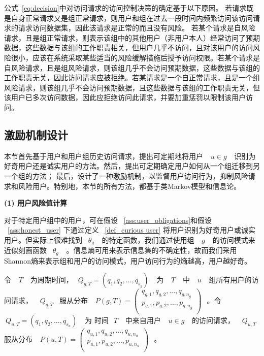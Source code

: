 公式~\ref{eq:decision}中对访问请求的访问控制决策的确定基于以下原因。 若请求既是自身正常请求又是组正常请求，则用户和组在过去一段时间内频繁访问该访问请求的请求访问数据集，因此该请求是正常的而且没有风险。 若某个请求是自风险请求，且是组正常请求，则表示该组中的其他用户（非用户本人）经常访问了预期数据，这些数据与该组的工作职责相关，但用户几乎不访问，且对该用户的访问风险很小，应该在系统采取某些适当的风险缓解措施后授予访问权限。若某个请求是自风险请求，且是组风险请求，则该组几乎不会访问预期数据，这些数据与该组的工作职责无关，因此访问请求应被拒绝。若某请求是一个自正常请求，且是一个组风险请求，则该组几乎不会访问预期数据，且这些数据与该组的工作职责无关，但该用户已多次访问数据，因此应拒绝访问此请求，并要加重惩罚以限制该用户访问。


\subsection{激励机制设计}
\label{subsec:User classification and incentive mechanism}

本节首先基于用户和用户组历史访问请求，提出可定期地将用户 ~$~u \in g~$~ 识别为好奇用户还是诚实用户的方法。然后，提出可定期确定用户如何从一个组迁移到另一个组的方法； 最后，设计了一种激励机制，以监督用户访问行为，抑制风险请求和风险用户。特别地，本节的所有方法，都基于类Markov模型和信息论。

\textbf{(1) 用户风险值计算}

对于特定用户组中的用户，可在假设 ~\ref{ass:user_obligations}和假设 ~\ref{ass:honest_user} 下通过定义 ~\ref{def_curious user} 将用户识别为好奇用户或诚实用户。但实际上很难找到 ~$\theta_g~$~ 的特定函数，我们通过使用组 ~$~g~$~ 的访问模式来近似刻画函数 ~$\theta_g~$~ 。信息熵可用来表示信息集的不确定性，故而我们采用Shannon熵来表示组和用户的访问模式，用户访问行为的熵越高，用户越好奇。

令 ~$~T~$~ 为周期时间，~$~Q_{g,T}=(q_1, q_2,...,q_{s_g})~$~ 为 ~$~T~$~ 中 ~$~u~$~ 组所有用户的访问请求， ~$~Q_{g,T}$~ 服从分布
~$~P(g,T)=
(
\begin{array}{l}
q_{g,1},  q_{g,2}, ...,q_{g,n_g}\\
p_{g,1},  p_{g,2}, ...,p_{g,n_g}\\
\end{array}
)
~$~。令 ~$~Q_{u,T}=(q_1, q_2,...,q_{s_u})~$~ 为 时间~$~T~$~ 中来自用户 ~$~u \in g~$~ 的访问请求， ~$~Q_{u,T}$~ 服从分布
~$~P(u,T)=
(
\begin{array}{l}
q_{u,1},  q_{u,2}, ...,q_{u,n_u}\\
p_{u,1},  p_{u,2}, ...,p_{u,n_u}\\
\end{array}
)
~$~。

